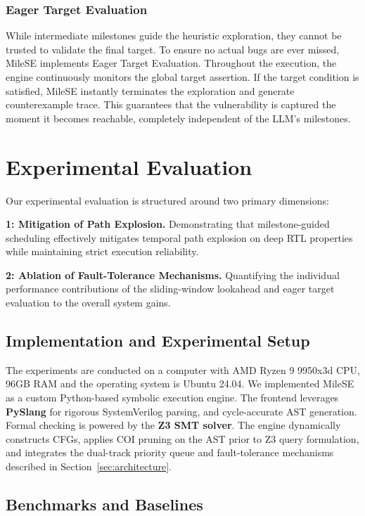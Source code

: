 \documentclass[conference]{IEEEtran}
\begin{document}
\subsubsection{Eager Target Evaluation}
While intermediate milestones guide the heuristic exploration, they cannot be trusted to validate the final target. To ensure no actual bugs are ever missed, MileSE implements Eager Target Evaluation. Throughout the execution, the engine continuously monitors the global target assertion. If the target condition is satisfied, MileSE instantly terminates the exploration and generate counterexample trace. This guarantees that the vulnerability is captured the moment it becomes reachable, completely independent of the LLM's milestones.

\section{Experimental Evaluation}
\label{sec:evaluation}

Our experimental evaluation is structured around two primary dimensions:

\textbf{1: Mitigation of Path Explosion.} Demonstrating that milestone-guided scheduling effectively mitigates temporal path explosion on deep RTL properties while maintaining strict execution reliability.

\textbf{2: Ablation of Fault-Tolerance Mechanisms.} Quantifying the individual performance contributions of the sliding-window lookahead and eager target evaluation to the overall system gains.

\subsection{Implementation and Experimental Setup}
The experiments are conducted on a computer with AMD Ryzen 9 9950x3d CPU, 96GB RAM and the operating system is Ubuntu 24.04.  We implemented MileSE as a custom Python-based symbolic execution engine. The frontend leverages \textbf{PySlang}\cite{pyslang} for rigorous SystemVerilog parsing,  and cycle-accurate AST generation. Formal checking is powered by the \textbf{Z3 SMT solver}\cite{z3}. The engine dynamically constructs CFGs, applies COI pruning on the AST prior to Z3 query formulation, and integrates the dual-track priority queue and fault-tolerance mechanisms described in Section~\ref{sec:architecture}. %


\subsection{Benchmarks and Baselines}
\label{subsec:setup}
\end{document}
